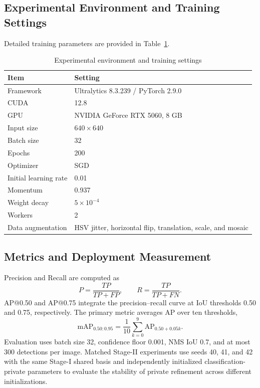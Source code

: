 \subsection{Experimental Environment and Training Settings}
Detailed training parameters are provided in Table~\ref{tab:environment}.

\begin{table}[H]
\caption{Experimental environment and training settings\label{tab:environment}}
\centering\srpatablesetup
\begin{tabular}{@{}p{}p{}@{}}
\toprule
Item & Setting\\
\midrule
Framework & Ultralytics 8.3.239 / PyTorch 2.9.0\\
CUDA & 12.8\\
GPU & NVIDIA GeForce RTX 5060, 8 GB\\
Input size & $640\times640$\\
Batch size & 32\\
Epochs & 200\\
Optimizer & SGD\\
Initial learning rate & 0.01\\
Momentum & 0.937\\
Weight decay & $5\times10^{-4}$\\
Workers & 2\\
Data augmentation & HSV jitter, horizontal flip, translation, scale, and mosaic\\
\bottomrule
\end{tabular}
\end{table}

\subsection{Metrics and Deployment Measurement}
Precision and Recall are computed as
\begin{equation}
P=\frac{TP}{TP+FP},\qquad R=\frac{TP}{TP+FN}.
\label{eq:pr}
\end{equation}
AP@0.50 and AP@0.75 integrate the precision--recall curve at IoU thresholds 0.50 and 0.75, respectively. The primary metric averages AP over ten thresholds,
\begin{equation}
\mathrm{mAP}_{0.50:0.95}=\frac{1}{10}\sum_{k=0}^{9}\mathrm{AP}_{0.50+0.05k}.
\label{eq:map}
\end{equation}
Evaluation uses batch size 32, confidence floor 0.001, NMS IoU 0.7, and at most 300 detections per image. Matched Stage-II experiments use seeds 40, 41, and 42 with the same Stage-I shared basis and independently initialized classification-private parameters to evaluate the stability of private refinement across different initializations.

